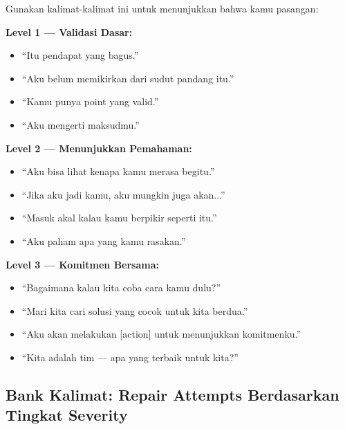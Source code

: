 \begin{praktikbox}
Gunakan kalimat-kalimat ini untuk menunjukkan bahwa kamu  pasangan:

\textbf{Level 1 --- Validasi Dasar:}
\begin{itemize}[itemsep=0.15cm]
    \item[$\square$] ``Itu pendapat yang bagus.''
    \item[$\square$] ``Aku belum memikirkan dari sudut pandang itu.''
    \item[$\square$] ``Kamu punya point yang valid.''
    \item[$\square$] ``Aku mengerti maksudmu.''
\end{itemize}

\textbf{Level 2 --- Menunjukkan Pemahaman:}
\begin{itemize}[itemsep=0.15cm]
    \item[$\square$] ``Aku bisa lihat kenapa kamu merasa begitu.''
    \item[$\square$] ``Jika aku jadi kamu, aku mungkin juga akan...''
    \item[$\square$] ``Masuk akal kalau kamu berpikir seperti itu.''
    \item[$\square$] ``Aku paham apa yang kamu rasakan.''
\end{itemize}

\textbf{Level 3 --- Komitmen Bersama:}
\begin{itemize}[itemsep=0.15cm]
    \item[$\square$] ``Bagaimana kalau kita coba cara kamu dulu?''
    \item[$\square$] ``Mari kita cari solusi yang cocok untuk kita berdua.''
    \item[$\square$] ``Aku akan melakukan [action] untuk menunjukkan komitmenku.''
    \item[$\square$] ``Kita adalah tim --- apa yang terbaik untuk kita?''
\end{itemize}
\end{praktikbox}

\subsection{Bank Kalimat: Repair Attempts Berdasarkan Tingkat Severity}

